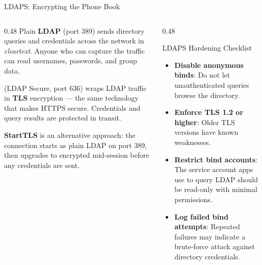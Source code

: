 \documentclass[aspectratio=169]{beamer}  %
\begin{document}
\begin{frame}{LDAPS: Encrypting the Phone Book}
    \begin{columns}[T]
        \begin{column}{0.48\textwidth}
            \footnotesize
            Plain \textbf{LDAP} (port 389) sends directory queries and credentials across the network in \emph{cleartext}. Anyone who can capture the traffic can read usernames, passwords, and group data.

            \vspace{0.4em}
             (LDAP Secure, port 636) wraps LDAP traffic in \textbf{TLS} encryption --- the same technology that makes HTTPS secure. Credentials and query results are protected in transit.

            \vspace{0.3em}
            \textbf{StartTLS} is an alternative approach: the connection starts as plain LDAP on port 389, then upgrades to encrypted mid-session before any credentials are sent.
        \end{column}
        \begin{column}{0.48\textwidth}
            \begin{alertblock}{LDAPS Hardening Checklist}
                \footnotesize
                \begin{itemize}
                    \item \textbf{Disable anonymous binds}: Do not let unauthenticated queries browse the directory.
                    \item \textbf{Enforce TLS 1.2 or higher}: Older TLS versions have known weaknesses.
                    \item \textbf{Restrict bind accounts}: The service account apps use to query LDAP should be read-only with minimal permissions.
                    \item \textbf{Log failed bind attempts}: Repeated failures may indicate a brute-force attack against directory credentials.
                \end{itemize}
            \end{alertblock}
        \end{column}
    \end{columns}
\end{frame}
\end{document}
